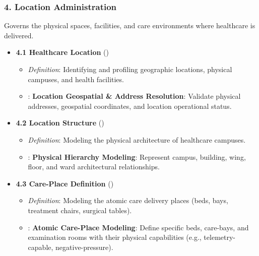 \subsubsection*{4. Location Administration}
\label{rad:enabling:175}

Governs the physical spaces, facilities, and care environments where healthcare is delivered.

\label{rad:enabling:177}

\begin{itemize}

\item 
\textbf{4.1 Healthcare Location} (\texttt{})


\begin{itemize}

\item 
\emph{Definition}: Identifying and profiling geographic locations, physical campuses, and health facilities.



\item 
\texttt{}: \textbf{Location Geospatial \& Address Resolution}: Validate physical addresses, geospatial coordinates, and location operational status.



\end{itemize}


\item 
\textbf{4.2 Location Structure} (\texttt{})


\begin{itemize}

\item 
\emph{Definition}: Modeling the physical architecture of healthcare campuses.



\item 
\texttt{}: \textbf{Physical Hierarchy Modeling}: Represent campus, building, wing, floor, and ward architectural relationships.



\end{itemize}


\item 
\textbf{4.3 Care-Place Definition} (\texttt{})


\begin{itemize}

\item 
\emph{Definition}: Modeling the atomic care delivery places (beds, bays, treatment chairs, surgical tables).



\item 
\texttt{}: \textbf{Atomic Care-Place Modeling}: Define specific beds, care-bays, and examination rooms with their physical capabilities (e.g., telemetry-capable, negative-pressure).



\end{itemize}


\end{itemize}
\label{rad:enabling:189}
